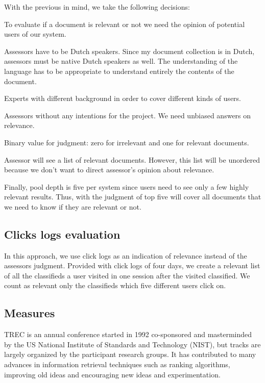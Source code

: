 With the previous in mind, we take the following decisions:

\begin{list}{.}{}
\item{To evaluate if a document is relevant or not  we need the opinion of potential users of our system.}
\item{Assessors have to be Dutch speakers. Since my document collection is in Dutch, assessors must be native Dutch speakers as well. The understanding of the language has to be appropriate to understand entirely the contents of the document.}
\item{Experts with different background in order to cover different kinds of users.}
\item{Assessors without any intentions for the project. We need unbiased answers on relevance.}
\item{Binary value for judgment: zero for irrelevant and one for relevant documents.}
\item{Assessor will see a list of relevant documents. However, this list will be unordered because we don't want to direct assessor's opinion about relevance.}
\item{Finally, pool depth is five per system since users need to see only a few highly relevant results. Thus, with the judgment of top five will cover all documents that we need to know if they are relevant or not.}
\end{list}




\subsection{Clicks logs evaluation}

In this approach, we use click logs as an indication of relevance instead of the assessors judgment. Provided with click logs of four days, we create a relevant list of all the classifieds a user visited in one session after the visited classified. We count as relevant only the classifieds which five different users click on.



\subsection{Measures}

TREC is an annual conference started in 1992 co-sponsored and masterminded by the US National Institute of Standards and Technology (NIST), but tracks are largely organized by the participant research groups. It has contributed to many advances in information retrieval techniques such as ranking algorithms, improving old ideas and encouraging new ideas and experimentation.

